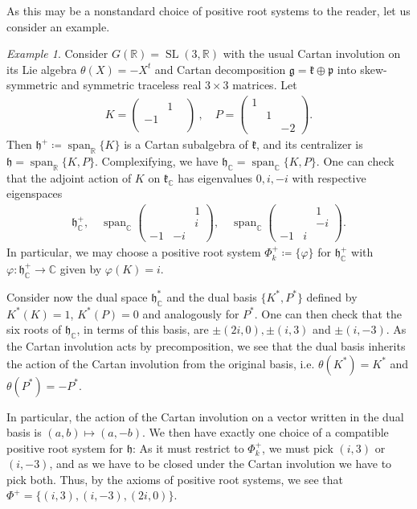 \documentclass[11pt,reqno]{amsart}
\numberwithin{equation}{section}
\theoremstyle{definition}
\theoremstyle{remark}
\newtheorem{exmp}[thm]{Example}
\newcommand{\SL}{\operatorname{SL}}
\renewcommand{\sp}{\operatorname{span}}
\newcommand{\mf}[1]{\mathfrak{#1}}
\newcommand{\C}{\mathbb{C}}
\newcommand{\R}{\mathbb{R}}
\renewcommand{\phi}{\varphi}
\begin{document}
\noindent As this may be a nonstandard choice of positive root systems to the reader, let us consider an example.

\begin{exmp}\label{SL(3,R)example}
    Consider $G(\R) = \SL(3,\R)$ with the usual Cartan involution on its Lie algebra $\theta(X) =-X^t$ and Cartan decomposition $\mf{g}=\mf{k}\oplus\mf{p}$ into skew-symmetric and symmetric traceless real $3\times 3$ matrices. Let
    \begin{align*}
        K=\begin{pmatrix}
            &1& \\
            -1&& \\
            &&
        \end{pmatrix}
        \:,\quad P = \begin{pmatrix}
            1 & & \\
            & 1 & \\
            & & -2
        \end{pmatrix}.
    \end{align*}
    \noindent Then $\mf{h}^+\coloneqq \sp_\R\lbrace K \rbrace$ is a Cartan subalgebra of $\mf{k}$, and its centralizer is $\mf{h} = \sp_\R\lbrace K,P\rbrace$. Complexifying, we have $\mf{h}_\C = \sp_\C\lbrace K,P\rbrace$. One can check that the adjoint action of $K$ on $\mf{k}_\C$ has eigenvalues $0,i,-i$ with respective eigenspaces
\begin{align*}
    \mf{h}^+_\C, \quad \sp_\C  \begin{pmatrix}
        & & 1\\
        & & i\\
        -1&-i&
    \end{pmatrix}, \quad 
    \sp_\C  \begin{pmatrix}
        & & 1\\
        & & -i\\
        -1&i&
    \end{pmatrix} .
\end{align*}
In particular, we may choose a positive root system $\Phi^+_k\coloneqq \lbrace \phi\rbrace$ for $\mf{h}^+_\C$ with $\phi:\mf{h}^+_\C\to \C$ given by $\phi(K) = i$. 

Consider now the dual space $\mf{h}^*_\C$ and the dual basis $\lbrace K^*,P^*\rbrace$ defined by $K^*(K) = 1$, $K^*(P) = 0$ and analogously for $P^*$. One can then check that the six roots of $\mf{h}_\C$, in terms of this basis, are $\pm( 2i,0), \pm( i,3)$ and $\pm( i,-3)$. As the Cartan involution acts by precomposition, we see that the dual basis inherits the action of the Cartan involution from the original basis, i.e. $\theta(K^*) = K^*$ and $\theta(P^*)=-P^*$.

In particular, the action of the Cartan involution on a vector written in the dual basis is $(a,b)\mapsto (a,-b)$. We then have exactly one choice of a compatible positive root system for $\mf{h}$: As it must restrict to $\Phi_k^+$, we must pick $(i,3)$ or $(i,-3)$, and as we have to be closed under the Cartan involution we have to pick both. Thus, by the axioms of positive root systems, we see that $\Phi^+ = \lbrace (i,3),(i,-3),(2i,0)\rbrace$.     
\end{exmp}
\end{document}
